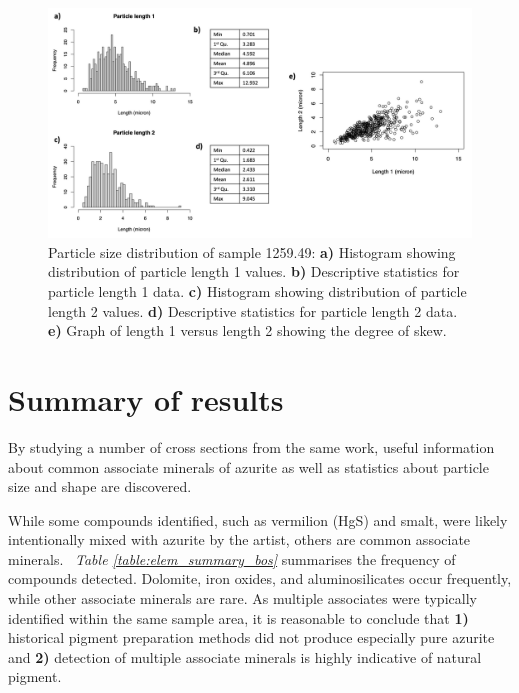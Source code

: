 \begin{figure}[H]
\centering
  \includegraphics[width=\linewidth]{1259-49_partsize}
\caption[Particle size distribution, sample 1259.49.]{Particle size distribution of sample 1259.49: \textbf{a)} Histogram showing distribution of particle length 1 values. \textbf{b)} Descriptive statistics for particle length 1 data. \textbf{c)} Histogram showing distribution of particle length 2 values. \textbf{d)} Descriptive statistics for particle length 2 data. \textbf{e)} Graph of length 1 versus length 2 showing the degree of skew.}
\label{fig:1259.49_partsize}
\end{figure}

\section{Summary of results}

By studying a number of cross sections from the same work, useful information about common associate minerals of azurite as well as statistics about particle size and shape are discovered. 

While some compounds identified, such as vermilion (HgS) and smalt, were likely intentionally mixed with azurite by the artist, others are common associate minerals.~\autocite{Aru} \textit{Table \ref{table:elem_summary_bos}} summarises the frequency of compounds detected. Dolomite, iron oxides, and aluminosilicates occur frequently, while other associate minerals are rare. As multiple associates were typically identified within the same sample area, it is reasonable to conclude that \textbf{1)} historical pigment preparation methods did not produce especially pure azurite and \textbf{2)} detection of multiple associate minerals is highly indicative of natural pigment.

